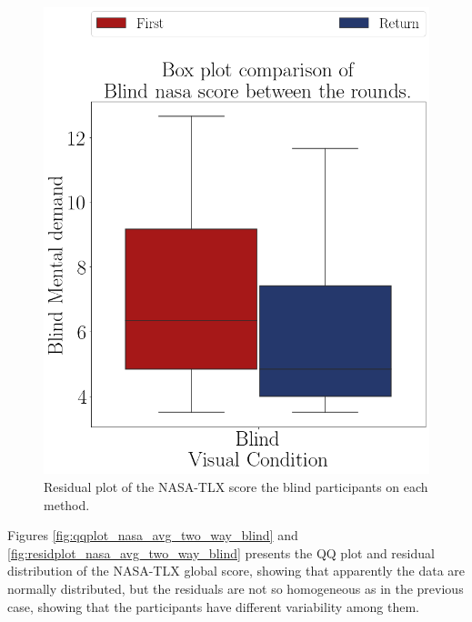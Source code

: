 \begin{figure}[!htb]
\begin{minipage}{0.45\textwidth}
        \includegraphics[width = 0.8\linewidth]{Resultados/Nasa/Figuras/png/boxplot_nasa_blind_rounds.png}
        \caption{Residual plot of the NASA-TLX score the blind participants on each method.}
        \label{fig:boxplot_nasa_blind_rounds}
    \end{minipage}
\end{figure}

%
%

Figures \ref{fig:qqplot_nasa_avg_two_way_blind} and \ref{fig:residplot_nasa_avg_two_way_blind} presents the QQ plot and residual distribution of the NASA-TLX global score, showing that apparently the data are normally distributed, but the residuals are not so homogeneous as in the previous case, showing that the participants have different variability among them.

